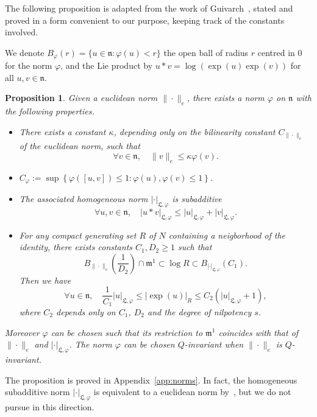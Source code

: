 \documentclass[11pt,leqno]{article}
\theoremstyle{plain}
\newtheorem{proposition}[theorem]{Proposition}
\theoremstyle{definition}
\theoremstyle{remark}
\numberwithin{equation}{section}
\begin{document}
The following proposition is adapted from the work of Guivarch~\cite{Guivarch}, stated and proved in a form convenient to our purpose, keeping track of the constants involved.

We denote $B_\varphi(r)=\{u\in \mathfrak{n}: \varphi(u) <r\}$ the open ball of radius $r$ centred in $0$  for the norm $\varphi$, and the Lie product by
$u\ast v=\log(\exp(u)\exp(v))$ for all $u,v \in \mathfrak{n}$.

\begin{proposition}\label{prop:normsubadd}
Given a euclidean norm $\|\cdot\|_e$, there exists a norm $\varphi$ on $\mathfrak{n}$ with the following properties.
\begin{itemize}
\item There exists a constant $\kappa$, depending only on the bilinearity constant $C_{\|\cdot\|_e}$ of the euclidean norm, such that
\[
\forall v \in \mathfrak{n}, \quad \|v\|_e \le \kappa \varphi(v).
\]

\item $C_\varphi:=\sup\left\{ \varphi([u,v]) \le 1 : \varphi(u),\varphi(v)\le 1\right\}$.
\item The associated homogeneous norm $|\cdot|_{\mathfrak{L},\varphi}$ is subadditive
\[
\forall u,v \in \mathfrak{n}, \quad |u\ast v|_{\mathfrak{L},\varphi} \le |u|_{\mathfrak{L},\varphi}+|v|_{\mathfrak{L},\varphi}.
\]
\item For any compact generating set $R$ of $N$ containing a neigborhood of the identity, there exists constants $C_1,D_2\ge 1$ such that 
\[
B_{\|\cdot\|_e}\left(\frac{1}{D_2}\right) \cap \mathfrak{m}^1 \subset \log R \subset B_{|\cdot|_{\mathfrak{L},\varphi}}(C_1).
\]
Then we have
\[
\forall u \in \mathfrak{n}, \quad \frac{1}{C_1} |u|_{\mathfrak{L},\varphi}\le  |\exp(u)|_R \le C_2\left(|u|_{\mathfrak{L},\varphi} +1\right),
\]
where $C_2$ depends only on $C_1$, $D_2$ and the degree of nilpotency $s$.
\end{itemize}
Moreover $\varphi$ can be chosen such that its restriction to $\mathfrak{m}^1$ coincides with that of $\|\cdot\|_e$ and $|\cdot|_{\mathfrak{L},\varphi}$. The norm $\varphi$ can be chosen $Q$-invariant when $\|\cdot\|_e$ is $Q$-invariant.
\end{proposition}

The proposition is proved in Appendix~\ref{app:norms}. 
In fact, the homogeneous subadditive norm $|\cdot|_{\mathfrak{L},\varphi}$ is equivalent to a euclidean norm by~\cite{HS90}, but we do not pursue in this direction.
\end{document}
